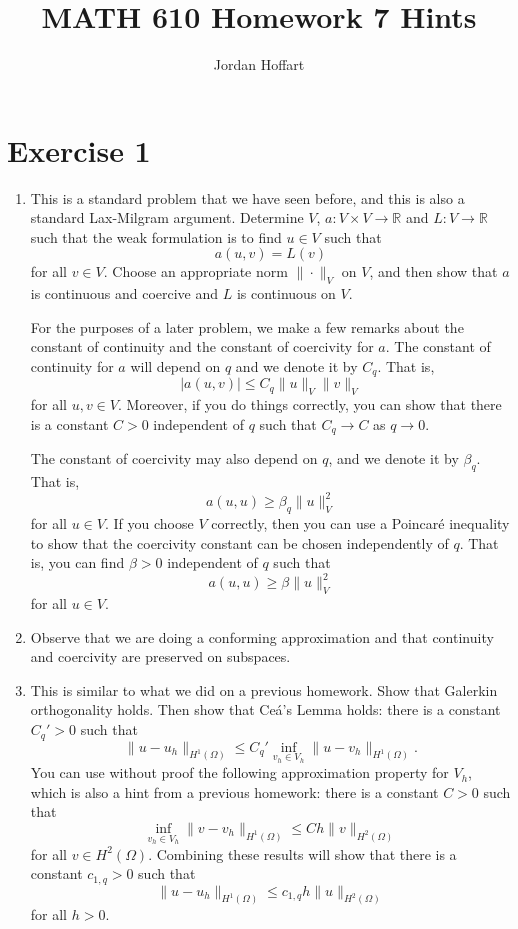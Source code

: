 \documentclass{article}
\title{MATH 610 Homework 7 Hints}
\author{Jordan Hoffart}
\date{}
\theoremstyle{plain}
\theoremstyle{definition}
\theoremstyle{remark}
\begin{document}
\maketitle
\section*{Exercise 1}
\begin{enumerate}
  \item This is a standard problem that we have seen before, and this is also a standard Lax-Milgram argument.
        Determine $V$, $a : V\times V \to \mathbb R$ and $L : V \to \mathbb R$ such that the weak formulation is to find $u \in V$ such that \[a(u,v) = L(v)\] for all $v \in V$.
        Choose an appropriate norm $\|\cdot\|_V$ on $V$, and then show that $a$ is continuous and coercive and $L$ is continuous on $V$.

        For the purposes of a later problem, we make a few remarks about the constant of continuity and the constant of coercivity for $a$.
        The constant of continuity for $a$ will depend on $q$ and we denote it by $C_q$.
        That is, \[|a(u,v)| \leq C_q\|u\|_V\|v\|_V\] for all $u,v \in V$.
        Moreover, if you do things correctly, you can show that there is a constant $C > 0$ independent of $q$ such that $C_q \to C$ as $q \to 0$.

        The constant of coercivity may also depend on $q$, and we denote it by $\beta_q$.
        That is, \[a(u,u) \geq \beta_q \|u\|_V^2\] for all $u \in V$.
        If you choose $V$ correctly, then you can use a Poincar\'e inequality to show that the coercivity constant can be chosen independently of $q$.
        That is, you can find $\beta > 0$ independent of $q$ such that \[a(u,u) \geq \beta \|u\|_V^2\] for all $u \in V$.

  \item Observe that we are doing a conforming approximation and that continuity and coercivity are preserved on subspaces.

  \item This is similar to what we did on a previous homework.
        Show that Galerkin orthogonality holds.
        Then show that Ce\'a's Lemma holds: there is a constant $C_q' > 0$ such that \[\|u-u_h\|_{H^1(\Omega)} \leq C_q'\inf_{v_h\in V_h}\|u-v_h\|_{H^1(\Omega)}.\]
        You can use without proof the following approximation property for $V_h$, which is also a hint from a previous homework: there is a constant $C > 0$ such that \[\inf_{v_h\in V_h}\|v-v_h\|_{H^1(\Omega)} \leq Ch\|v\|_{H^2(\Omega)}\] for all $v \in H^2(\Omega)$.
        Combining these results will show that there is a constant $c_{1,q} > 0$ such that \[\|u-u_h\|_{H^1(\Omega)} \leq c_{1,q}h\|u\|_{H^2(\Omega)}\] for all $h > 0$.


\end{enumerate}
\end{document}
